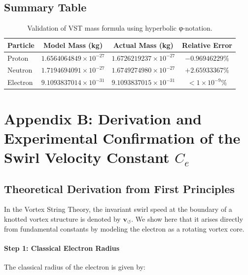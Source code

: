 \documentclass[11pt]{article}
\begin{document}
    \subsection*{Summary Table}
    \begin{table}[H]
        \centering
        \begin{tabular}{lccc}
            \toprule
            \textbf{Particle} & \textbf{Model Mass (kg)} & \textbf{Actual Mass (kg)} & \textbf{Relative Error} \\
            \midrule
            Proton   & $1.6564064849 \times 10^{-27}$ & $1.6726219237 \times 10^{-27}$ & $-0.96946229\%$ \\
            Neutron  & $1.7194694091 \times 10^{-27}$ & $1.6749274980 \times 10^{-27}$ & $+2.65933367\%$ \\
            Electron & $9.1093837014 \times 10^{-31}$ & $9.1093837015 \times 10^{-31}$ & $< 1\times 10^{-9}\%$ \\
            \bottomrule
        \end{tabular}
        \caption{Validation of VST mass formula using hyperbolic φ-notation.}
    \end{table}




    \appendix
    \section*{Appendix B: Derivation and Experimental Confirmation of the Swirl Velocity Constant \(C_e\)}

    \subsection*{Theoretical Derivation from First Principles}

    In the Vortex String Theory, the invariant swirl speed at the boundary of a knotted vortex structure is denoted by \( \mathbf{v}_{\scriptscriptstyle\boldsymbol{\circlearrowleft}} \). We show here that it arises directly from fundamental constants by modeling the electron as a rotating vortex core.

    \paragraph{Step 1: Classical Electron Radius}
    The classical radius of the electron is given by:
\end{document}
